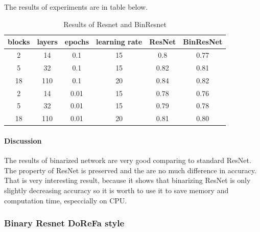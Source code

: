 \documentclass[licencjacka]{pracamgr}
\begin{document}
		        The results of experiments are in table below.
		        \begin{table}[H]
		                        \caption{Results of Resnet and BinResnet}
		                        \centering
		                        \begin{tabular}{c c c c c c}
		                        \hline\hline
		                        blocks & layers & epochs & learning rate & ResNet & BinResNet  \\ [0.5ex]
		                        \hline
		                                2 & 14  & 0.1   & 15 & 0.8 & 0.77 \\
		                                5 & 32  & 0.1   & 15 & 0.82 & 0.81 \\
		                                18      & 110 & 0.1     & 20 & 0.84 & 0.82\\
		                        \hline
		                                2 & 14  & 0.01  & 15 & 0.78 & 0.76 \\
		                                5 & 32  & 0.01  & 15 & 0.79 & 0.78 \\
		                                18 & 110 & 0.01 & 20 & 0.81 & 0.80 \\
		                        \hline
		                        \end{tabular}
		                        \label{table:nonlin}
		                \end{table}

		        \paragraph{Discussion} 

		        The results of binarized network are very good comparing to standard ResNet. The property of ResNet is preserved and the are no much difference in accuracy. That is very interesting result, because it shows that binarizing ResNet is only slightly decreasing accuracy so it is worth to use it to save memory and computation time, especcially on CPU.


		\subsubsection{Binary Resnet DoReFa style}
\end{document}
